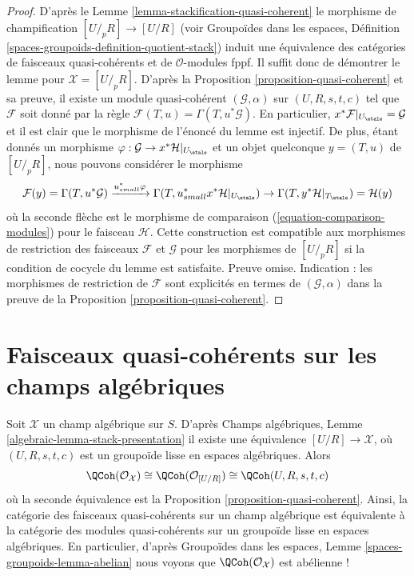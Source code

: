 \begin{proof}
D'après le
Lemme \ref{lemma-stackification-quasi-coherent}
le morphisme de champification $[U/_{\!p}R] \to [U/R]$ (voir
Groupoïdes dans les espaces, Définition
\ref{spaces-groupoids-definition-quotient-stack})
induit une équivalence des catégories de faisceaux quasi-cohérents
et de $\mathcal{O}$-modules fppf.
Il suffit donc de démontrer le lemme pour $\mathcal{X} = [U/_{\!p}R]$.
D'après la Proposition \ref{proposition-quasi-coherent}
et sa preuve, il existe un module quasi-cohérent
$(\mathcal{G}, \alpha)$ sur $(U, R, s, t, c)$ tel que
$\mathcal{F}$ soit donné par la règle
$\mathcal{F}(T, u) = \Gamma(T, u^*\mathcal{G})$.
En particulier, $x^*\mathcal{F}|_{U_\etale} = \mathcal{G}$
et il est clair que le morphisme de l'énoncé du
lemme est injectif. De plus, étant donnés un morphisme
$\varphi : \mathcal{G} \to x^*\mathcal{H}|_{U_\etale}$
et un objet quelconque
$y = (T, u)$ de $[U/_{\!p}R]$, nous pouvons considérer le morphisme
$$
\mathcal{F}(y) = \Gamma(T, u^*\mathcal{G})
\xrightarrow{u_{small}^*\varphi}
\Gamma(T, u_{small}^*x^*\mathcal{H}|_{U_\etale})
\rightarrow
\Gamma(T, y^*\mathcal{H}|_{T_\etale}) = \mathcal{H}(y)
$$
où la seconde flèche est le morphisme de comparaison
(\ref{equation-comparison-modules}) pour le faisceau $\mathcal{H}$.
Cette construction est compatible aux morphismes de restriction des
faisceaux $\mathcal{F}$ et $\mathcal{G}$ pour les morphismes de
$[U/_{\!p}R]$ si la condition de cocycle du
lemme est satisfaite. Preuve omise. Indication : les morphismes de restriction
de $\mathcal{F}$ sont explicités en termes de $(\mathcal{G}, \alpha)$
dans la preuve de la
Proposition \ref{proposition-quasi-coherent}.
\end{proof}







\section{Faisceaux quasi-cohérents sur les champs algébriques}
\label{section-quasi-coherent-algebraic-stacks}

\noindent
Soit $\mathcal{X}$ un champ algébrique sur $S$. D'après
Champs algébriques, Lemme \ref{algebraic-lemma-stack-presentation}
il existe une équivalence $[U/R] \to \mathcal{X}$,
où $(U, R, s, t, c)$ est un groupoïde lisse en espaces algébriques.
Alors
$$
\QCoh(\mathcal{O}_\mathcal{X})
\cong
\QCoh(\mathcal{O}_{[U/R]})
\cong
\QCoh(U, R, s, t, c)
$$
où la seconde équivalence est la
Proposition \ref{proposition-quasi-coherent}.
Ainsi, la catégorie des faisceaux quasi-cohérents sur un champ algébrique
est équivalente à la catégorie des modules quasi-cohérents sur un groupoïde
lisse en espaces algébriques. En particulier, d'après
Groupoïdes dans les espaces, Lemme \ref{spaces-groupoids-lemma-abelian}
nous voyons que $\QCoh(\mathcal{O}_\mathcal{X})$ est abélienne !

